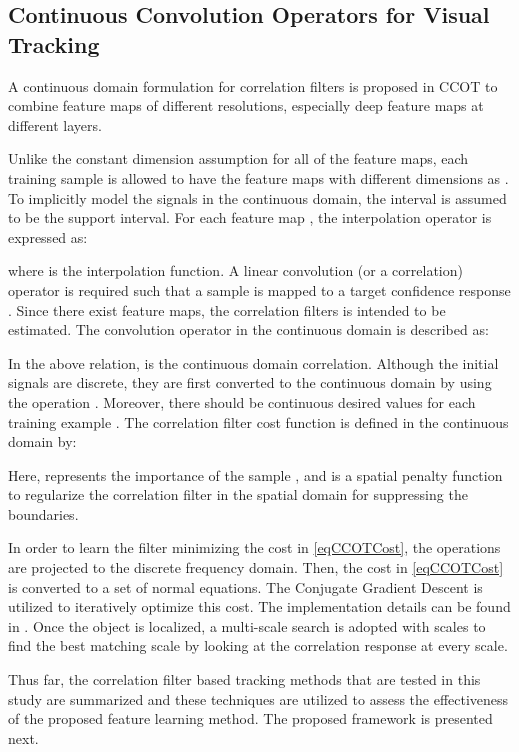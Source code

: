 \documentclass[journal]{IEEEtran}
\begin{document}
\subsection{Continuous Convolution Operators for Visual Tracking}
\label{secCCOT}
A continuous domain formulation for correlation filters is proposed in CCOT \cite{CCOT} to combine feature maps of different resolutions, especially deep feature maps at different layers.

Unlike the constant dimension assumption for all of the feature maps, each training sample  is allowed to have the feature maps with different dimensions as . To implicitly model the signals in the continuous domain, the interval  is assumed to be the support interval. For each feature map , the interpolation operator is expressed as:

where  is the interpolation function. A linear convolution (or a correlation) operator  is required such that a sample  is mapped to a target confidence response . Since there exist  feature maps, the correlation filters  is intended to be estimated. The convolution operator in the continuous domain is described as:

In the above relation,  is the continuous domain correlation. Although the initial signals are discrete, they are first converted to the continuous domain by using the operation . Moreover, there should be continuous desired values  for each training example . The correlation filter cost function is defined in the continuous domain by:

Here,  represents the importance of the sample , and  is a spatial penalty function to regularize the correlation filter in the spatial domain for suppressing the boundaries.

In order to learn the filter  minimizing the cost in \eqref{eqCCOTCost}, the operations are projected to the discrete frequency domain. Then, the cost in \eqref{eqCCOTCost} is converted to a set of normal equations. The Conjugate Gradient Descent is utilized to iteratively optimize this cost. The implementation details can be found in \cite{CCOT}. Once the object is localized, a multi-scale search is adopted with  scales to find the best matching scale by looking at the correlation response at every scale.

Thus far, the correlation filter based tracking methods that are tested in this study are summarized and these techniques are utilized to assess the effectiveness of the proposed feature learning method. The proposed framework is presented next.
\end{document}
